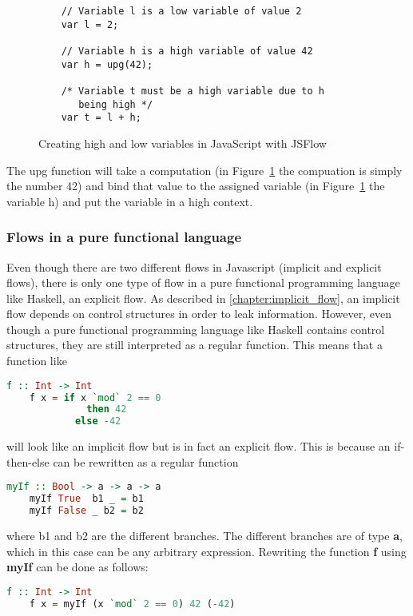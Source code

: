 \begin{figure}[h]
  \begin{lstlisting}
    // Variable l is a low variable of value 2
    var l = 2;

    // Variable h is a high variable of value 42
    var h = upg(42);

    /* Variable t must be a high variable due to h
       being high */
    var t = l + h;
  \end{lstlisting}
  \caption{Creating high and low variables in JavaScript with JSFlow}
  \label{fig:upg}
\end{figure}
The upg function will take a computation (in Figure~\ref{fig:upg} the compuation is simply the number 42) and bind that value to the assigned variable (in Figure~\ref{fig:upg} the variable h) and put the variable in a high context.

\subsubsection{Flows in a pure functional language}
Even though there are two different flows in Javascript (implicit and explicit flows), there is only one type of flow in a pure functional programming language like Haskell, an explicit flow.\cite{seclib} As described in \ref{chapter:implicit_flow}, an implicit flow depends on control structures in order to leak information. However, even though a pure functional programming language like Haskell contains control structures, they are still interpreted as a regular function. This means that a function like
\begin{center}
  \begin{lstlisting}[language=Haskell]
    f :: Int -> Int
    f x = if x `mod` 2 == 0
              then 42
            else -42
  \end{lstlisting}
\end{center}
will look like an implicit flow but is in fact an explicit flow. This is because an if-then-else can be rewritten as a regular function \cite{if-then-else}
\begin{center}
  \begin{lstlisting}[language=Haskell]
    myIf :: Bool -> a -> a -> a
    myIf True  b1 _ = b1
    myIf False _ b2 = b2
  \end{lstlisting}
\end{center}
where b1 and b2 are the different branches. The different branches are of type \textbf{a}, which in this case can be any arbitrary expression. Rewriting the function \textbf{f} using \textbf{myIf} can be done as follows:
\begin{center}
  \begin{lstlisting}[language=Haskell]
    f :: Int -> Int
    f x = myIf (x `mod` 2 == 0) 42 (-42)
  \end{lstlisting}
\end{center}

